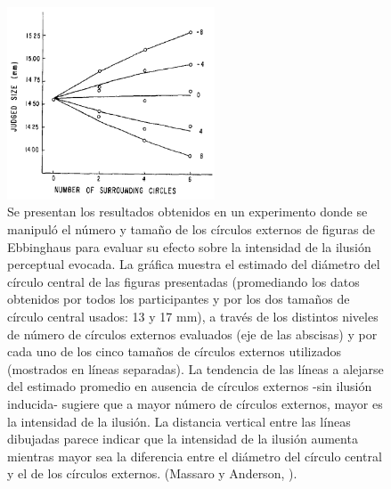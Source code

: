 \begin{figure}[th]
\centering
\includegraphics[width=0.55\textwidth]{Figures/Ebb_Variables} 
\decoRule
\caption[Efecto del Número y Tamaño de los círculos externos en la intensidad de la Ilusión de Ebbinghaus]{Se presentan los resultados obtenidos en un experimento donde se manipuló el número y tamaño de los círculos externos de figuras de Ebbinghaus para evaluar su efecto sobre la intensidad de la ilusión perceptual evocada. La gráfica muestra el estimado del diámetro del círculo central de las figuras presentadas (promediando los datos obtenidos por todos los participantes y por los dos tamaños de círculo central usados: 13 y 17 mm), a través de los distintos niveles de número de círculos externos evaluados (eje de las abscisas) y por cada uno de los cinco tamaños de círculos externos utilizados (mostrados en líneas separadas). La tendencia de las líneas a alejarse del estimado promedio en ausencia de círculos externos -sin ilusión inducida- sugiere que a mayor número de círculos externos, mayor es la intensidad de la ilusión. La distancia vertical entre las líneas dibujadas parece indicar que la intensidad de la ilusión aumenta mientras mayor sea la diferencia entre el diámetro del círculo central y el de los círculos externos. (Massaro y Anderson, \citeyear{Massaro1971}).}
\label{fig:Ebb_Var}
\end{figure}

